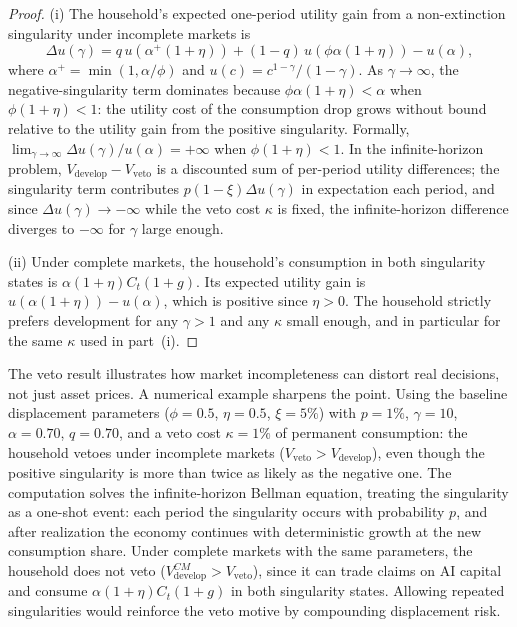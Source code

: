 \documentclass[12pt]{article}
\begin{document}
\begin{proof}
(i) The household's expected one-period utility gain from a non-extinction singularity under incomplete markets is
%
\begin{equation}
\Delta u(\gamma) = q \, u(\alpha^+\!(1+\eta)) + (1-q) \, u(\phi\alpha(1+\eta)) - u(\alpha), \label{eq:veto-delta-u}
\end{equation}
%
where $\alpha^+ = \min(1, \alpha/\phi)$ and $u(c) = c^{1-\gamma}/(1-\gamma)$. As $\gamma \to \infty$, the negative-singularity term dominates because $\phi\alpha(1+\eta) < \alpha$ when $\phi(1+\eta) < 1$: the utility cost of the consumption drop grows without bound relative to the utility gain from the positive singularity. Formally, $\lim_{\gamma \to \infty} \Delta u(\gamma) / u(\alpha) = +\infty$ when $\phi(1+\eta) < 1$. In the infinite-horizon problem, $V_\text{develop} - V_\text{veto}$ is a discounted sum of per-period utility differences; the singularity term contributes $p(1-\xi)\Delta u(\gamma)$ in expectation each period, and since $\Delta u(\gamma) \to -\infty$ while the veto cost $\kappa$ is fixed, the infinite-horizon difference diverges to $-\infty$ for $\gamma$ large enough.

(ii) Under complete markets, the household's consumption in both singularity states is $\alpha(1+\eta)C_t(1+g)$. Its expected utility gain is $u(\alpha(1+\eta)) - u(\alpha)$, which is positive since $\eta > 0$. The household strictly prefers development for any $\gamma > 1$ and any $\kappa$ small enough, and in particular for the same $\kappa$ used in part~(i).
\end{proof}

The veto result illustrates how market incompleteness can distort real decisions, not just asset prices. A numerical example sharpens the point. Using the baseline displacement parameters ($\phi = 0.5$, $\eta = 0.5$, $\xi = 5\%$) with $p = 1\%$, $\gamma = 10$, $\alpha = 0.70$, $q = 0.70$, and a veto cost $\kappa = 1\%$ of permanent consumption: the household vetoes under incomplete markets ($V_\text{veto} > V_\text{develop}$), even though the positive singularity is more than twice as likely as the negative one. The computation solves the infinite-horizon Bellman equation, treating the singularity as a one-shot event: each period the singularity occurs with probability $p$, and after realization the economy continues with deterministic growth at the new consumption share. Under complete markets with the same parameters, the household does not veto ($V_\text{develop}^{CM} > V_\text{veto}$), since it can trade claims on AI capital and consume $\alpha(1+\eta)C_t(1+g)$ in both singularity states. Allowing repeated singularities would reinforce the veto motive by compounding displacement risk.
\end{document}
